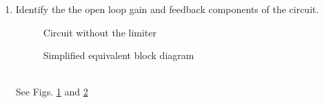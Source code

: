 \begin{enumerate}[label=\arabic*.,ref=\theenumi]
\item Identify the the open loop gain and feedback  components of the circuit.
\renewcommand{\thefigure}{\theenumi.\arabic{figure}}
\begin{figure}[!ht]
	\begin{center}
		\resizebox{\columnwidth}{!}{}
	\end{center}
\caption{Circuit without the limiter}
\label{fig:es17btech11009_b4}
\end{figure}
\begin{figure}[!ht]
	\begin{center}
		\resizebox{\columnwidth}{!}{}
	\end{center}
\caption{Simplified equivalent block diagram}
\label{fig:es17btech11009_block}
\end{figure}
\renewcommand{\thefigure}{\theenumi}
\\
\solution See Figs. \ref{fig:es17btech11009_b4} and \ref{fig:es17btech11009_block}



\end{enumerate}
